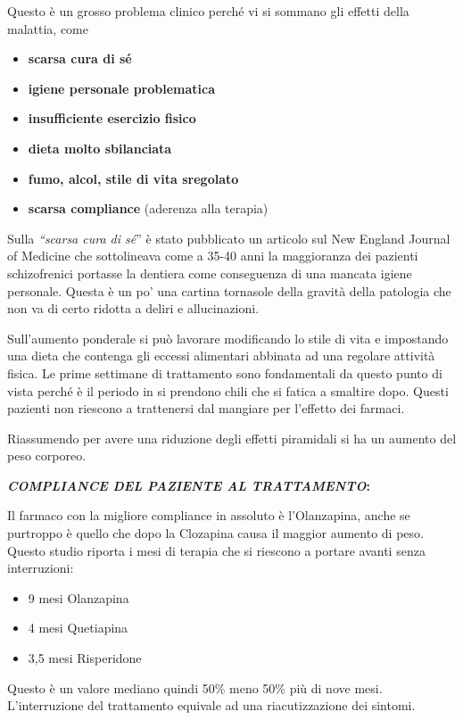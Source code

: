 \documentclass[]{article}
\begin{document}
Questo è un grosso problema clinico perché vi si sommano gli effetti
della malattia, come

\begin{itemize}
\item
  \textbf{scarsa cura di sé}
\item
  \textbf{igiene personale problematica}
\item
  \textbf{insufficiente esercizio fisico }
\item
  \textbf{dieta molto sbilanciata}
\item
  \textbf{fumo, alcol, stile di vita sregolato }
\item
  \textbf{scarsa compliance} (aderenza alla terapia)
\end{itemize}

Sulla \emph{``scarsa cura di sé}'' è stato pubblicato un articolo sul
New England Journal of Medicine che sottolineava come a 35-40 anni la
maggioranza dei pazienti schizofrenici portasse la dentiera come
conseguenza di una mancata igiene personale. Questa è un po' una cartina
tornasole della gravità della patologia che non va di certo ridotta a
deliri e allucinazioni.

Sull'aumento ponderale si può lavorare modificando lo stile di vita e
impostando una dieta che contenga gli eccessi alimentari abbinata ad una
regolare attività fisica. Le prime settimane di trattamento sono
fondamentali da questo punto di vista perché è il periodo in si prendono
chili che si fatica a smaltire dopo. Questi pazienti non riescono a
trattenersi dal mangiare per l'effetto dei farmaci.

Riassumendo per avere una riduzione degli effetti piramidali si ha un
aumento del peso corporeo.

\textbf{\emph{COMPLIANCE DEL PAZIENTE AL TRATTAMENTO}:}

Il farmaco con la migliore compliance in assoluto è l'Olanzapina, anche
se purtroppo è quello che dopo la Clozapina causa il maggior aumento di
peso. Questo studio riporta i mesi di terapia che si riescono a portare
avanti senza interruzioni:

\begin{itemize}
\item
  9 mesi Olanzapina
\item
  4 mesi Quetiapina
\item
  3,5 mesi Risperidone
\end{itemize}

Questo è un valore mediano quindi 50\% meno 50\% più di nove mesi.
L'interruzione del trattamento equivale ad una riacutizzazione dei
sintomi.
\end{document}
